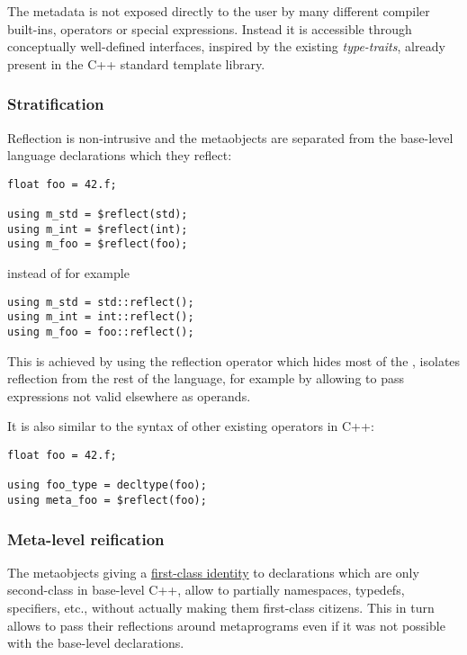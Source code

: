The metadata is not exposed directly to the user by many different compiler
built-ins, operators or special expressions.
Instead it is accessible through conceptually well-defined interfaces,
inspired by the existing {\em type-traits}, already present in
the C++ standard template library.

\subsubsection{Stratification}
\label{design-stratification}

Reflection is non-intrusive and the metaobjects are separated
from the base-level language declarations which they reflect:

\begin{verbatim}
float foo = 42.f;

using m_std = $reflect(std);
using m_int = $reflect(int);
using m_foo = $reflect(foo);
\end{verbatim}

instead of for example

\begin{verbatim}
using m_std = std::reflect();
using m_int = int::reflect();
using m_foo = foo::reflect();
\end{verbatim}

This is achieved by using the reflection operator which hides most of the
, isolates reflection from the rest of the language,
for example by allowing to pass expressions not valid elsewhere as operands.

It is also similar to the syntax of other existing operators in C++:

\begin{verbatim}
float foo = 42.f;

using foo_type = decltype(foo);
using meta_foo = $reflect(foo);
\end{verbatim}

\subsubsection{Meta-level reification}
\label{design-reification}

The metaobjects giving a \hyperref[term-first-class]{first-class identity}
to declarations which are only second-class in base-level C++,
allow to partially \hyperref[term-reification]{} namespaces,
typedefs, specifiers, etc., without actually
making them first-class citizens. This in turn allows to pass their
reflections around metaprograms even if it was not possible with the
base-level declarations.

